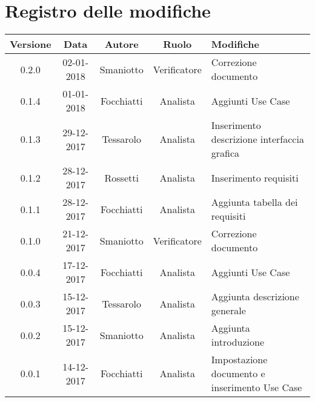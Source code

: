 \documentclass[./AnalisideiRequisiti.tex]{subfiles}
\begin{document}
	
\chapter*{Registro delle modifiche}
\begin{center}	
	\begin{tabular}{|c|c|c|c|p{4cm}|}
		\hline
		\textbf{Versione} & \textbf{Data} & \textbf{Autore} & \textbf{Ruolo} & \textbf{Modifiche} \\ \hline		
		0.2.0 & 02-01-2018 & Smaniotto & Verificatore & Correzione documento \\ \hline		
		0.1.4 & 01-01-2018 & Focchiatti & Analista & Aggiunti Use Case \\ \hline
		0.1.3 & 29-12-2017 & Tessarolo & Analista & Inserimento descrizione interfaccia grafica \\ \hline
		0.1.2 & 28-12-2017 & Rossetti & Analista & Inserimento requisiti \\ \hline
		0.1.1 & 28-12-2017 & Focchiatti & Analista & Aggiunta tabella dei requisiti \\ \hline
		0.1.0 & 21-12-2017 & Smaniotto & Verificatore & Correzione documento \\ \hline
		0.0.4 & 17-12-2017 & Focchiatti & Analista & Aggiunti Use Case \\ \hline
		0.0.3 & 15-12-2017 & Tessarolo & Analista & Aggiunta descrizione generale \\ \hline
		0.0.2 & 15-12-2017 & Smaniotto & Analista & Aggiunta introduzione \\ \hline
		0.0.1 & 14-12-2017 & Focchiatti & Analista & Impostazione documento e inserimento Use Case \\ \hline
	\end{tabular}
\end{center}	
\end{document}
